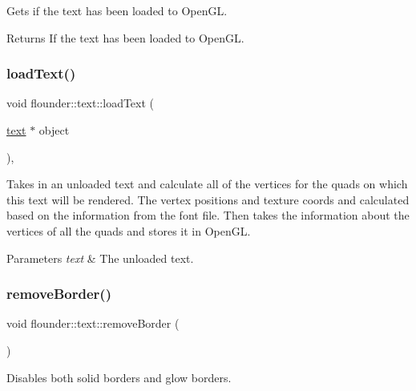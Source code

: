 Gets if the text has been loaded to Open\+GL. 

\begin{DoxyReturn}{Returns}
If the text has been loaded to Open\+GL. 
\end{DoxyReturn}
\mbox{\label{classflounder_1_1text_aa5fea613182b186ca1c7b52900378e03}} 
\subsubsection{\texorpdfstring{load\+Text()}{loadText()}}
{\footnotesize\ttfamily void flounder\+::text\+::load\+Text (\begin{DoxyParamCaption}\item[{\hyperlink{classflounder_1_1text}{text} $\ast$}]{object }\end{DoxyParamCaption})\hspace{0.3cm}{\ttfamily [static]}, {\ttfamily [private]}}



Takes in an unloaded text and calculate all of the vertices for the quads on which this text will be rendered. The vertex positions and texture coords and calculated based on the information from the font file. Then takes the information about the vertices of all the quads and stores it in Open\+GL. 


\begin{DoxyParams}{Parameters}
{\em text} & The unloaded text. \\
\hline
\end{DoxyParams}
\mbox{\label{classflounder_1_1text_a55496b7300a9fd68d56f9ecf7f9351d8}} 
\subsubsection{\texorpdfstring{remove\+Border()}{removeBorder()}}
{\footnotesize\ttfamily void flounder\+::text\+::remove\+Border (\begin{DoxyParamCaption}{ }\end{DoxyParamCaption})}



Disables both solid borders and glow borders. 

